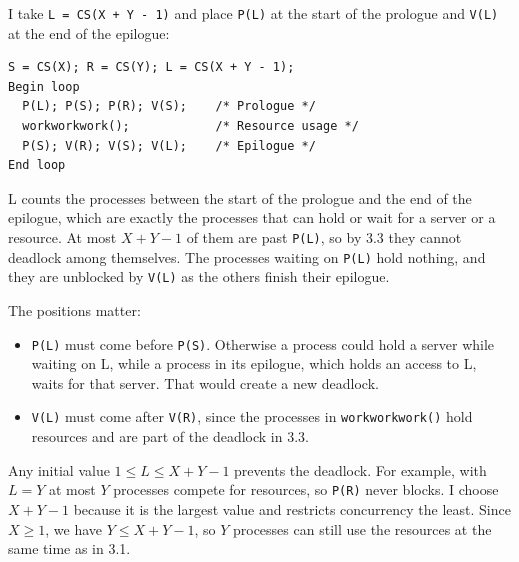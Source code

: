 \documentclass[letterpaper, 11pt]{article}
\newcommand{\1}{\mathds{1}}	%
\theoremstyle{definition}
\begin{document}
I take \texttt{L = CS(X + Y - 1)} and place \texttt{P(L)} at the start of the prologue and \texttt{V(L)} at the end of the epilogue:

\begin{lstlisting}
S = CS(X); R = CS(Y); L = CS(X + Y - 1);
Begin loop
  P(L); P(S); P(R); V(S);    /* Prologue */
  workworkwork();            /* Resource usage */
  P(S); V(R); V(S); V(L);    /* Epilogue */
End loop
\end{lstlisting}

L counts the processes between the start of the prologue and the end of the epilogue, which are exactly the processes that can hold or wait for a server or a resource. At most $X + Y - 1$ of them are past \texttt{P(L)}, so by 3.3 they cannot deadlock among themselves. The processes waiting on \texttt{P(L)} hold nothing, and they are unblocked by \texttt{V(L)} as the others finish their epilogue.

The positions matter:
\begin{itemize}
  \item \texttt{P(L)} must come before \texttt{P(S)}. Otherwise a process could hold a server while waiting on L, while a process in its epilogue, which holds an access to L, waits for that server. That would create a new deadlock.
  \item \texttt{V(L)} must come after \texttt{V(R)}, since the processes in \texttt{workworkwork()} hold resources and are part of the deadlock in 3.3.
\end{itemize}

Any initial value $1 \le L \le X + Y - 1$ prevents the deadlock. For example, with $L = Y$ at most $Y$ processes compete for resources, so \texttt{P(R)} never blocks. I choose $X + Y - 1$ because it is the largest value and restricts concurrency the least. Since $X \ge 1$, we have $Y \le X + Y - 1$, so $Y$ processes can still use the resources at the same time as in 3.1.
\end{document}
